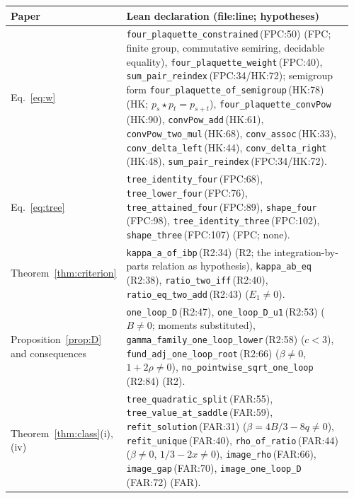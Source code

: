 \documentclass[11pt,a4paper]{article}
\theoremstyle{definition}
\theoremstyle{remark}
\newcommand{\code}[1]{\texttt{#1}}
\begin{document}
{\small\sloppy
\begin{longtable}{@{}p{0.2\linewidth}p{0.76\linewidth}@{}}
\toprule
Paper & Lean declaration (file:line; hypotheses)\\ \midrule
\endhead
Eq.~\eqref{eq:w} & \code{four\_plaquette\_constrained}\,{\scriptsize(FPC:50)} (FPC; finite group, commutative semiring, decidable equality), \code{four\_plaquette\_weight}\,{\scriptsize(FPC:40)}, \code{sum\_pair\_reindex}\,{\scriptsize(FPC:34/HK:72)}; semigroup form \code{four\_plaquette\_of\_semigroup}\,{\scriptsize(HK:78)} (HK; $p_s\star p_t=p_{s+t}$), \code{four\_plaquette\_convPow}\,{\scriptsize(HK:90)}, \code{convPow\_add}\,{\scriptsize(HK:61)}, \code{convPow\_two\_mul}\,{\scriptsize(HK:68)}, \code{conv\_assoc}\,{\scriptsize(HK:33)}, \code{conv\_delta\_left}\,{\scriptsize(HK:44)}, \code{conv\_delta\_right}\,{\scriptsize(HK:48)}, \code{sum\_pair\_reindex}\,{\scriptsize(FPC:34/HK:72)}. \\
\midrule
Eq.~\eqref{eq:tree} & \code{tree\_identity\_four}\,{\scriptsize(FPC:68)}, \code{tree\_lower\_four}\,{\scriptsize(FPC:76)}, \code{tree\_attained\_four}\,{\scriptsize(FPC:89)}, \code{shape\_four}\,{\scriptsize(FPC:98)}, \code{tree\_identity\_three}\,{\scriptsize(FPC:102)}, \code{shape\_three}\,{\scriptsize(FPC:107)} (FPC; none). \\
\midrule
Theorem~\ref{thm:criterion} & \code{kappa\_a\_of\_ibp}\,{\scriptsize(R2:34)} (R2; the integration-by-parts relation as hypothesis), \code{kappa\_ab\_eq}\,{\scriptsize(R2:38)}, \code{ratio\_two\_iff}\,{\scriptsize(R2:40)}, \code{ratio\_eq\_two\_add}\,{\scriptsize(R2:43)} ($E_1\ne0$). \\
\midrule
Proposition~\ref{prop:D} and consequences & \code{one\_loop\_D}\,{\scriptsize(R2:47)}, \code{one\_loop\_D\_u1}\,{\scriptsize(R2:53)} ($B\ne0$; moments substituted), \code{gamma\_family\_one\_loop\_lower}\,{\scriptsize(R2:58)} ($c<3$), \code{fund\_adj\_one\_loop\_root}\,{\scriptsize(R2:66)} ($\beta\ne0$, $1+2\rho\ne0$), \code{no\_pointwise\_sqrt\_one\_loop}\,{\scriptsize(R2:84)} (R2). \\
\midrule
Theorem~\ref{thm:class}(i),(iv) & \code{tree\_quadratic\_split}\,{\scriptsize(FAR:55)}, \code{tree\_value\_at\_saddle}\,{\scriptsize(FAR:59)}, \code{refit\_solution}\,{\scriptsize(FAR:31)} ($\beta=4B/3-8q\ne0$), \code{refit\_unique}\,{\scriptsize(FAR:40)}, \code{rho\_of\_ratio}\,{\scriptsize(FAR:44)} ($\beta\ne0$, $1/3-2x\ne0$), \code{image\_rho}\,{\scriptsize(FAR:66)}, \code{image\_gap}\,{\scriptsize(FAR:70)}, \code{image\_one\_loop\_D}\,{\scriptsize(FAR:72)} (FAR). \\

\end{longtable}}
\end{document}
